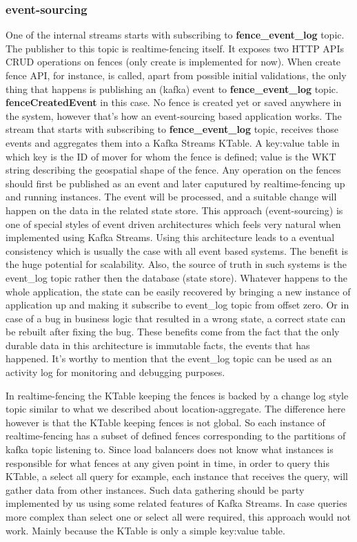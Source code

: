 \documentclass[a4]{report}
\begin{document}
    \subsubsection{event-sourcing}
    One of the internal streams starts with subscribing to \textbf{fence\_event\_log} topic.
    The publisher to this topic is realtime-fencing itself.
    It exposes two HTTP APIs CRUD operations on fences (only create is implemented for now).
    When create fence API, for instance, is called, apart from possible initial validations, the
    only thing that happens is publishing an (kafka) event to \textbf{fence\_event\_log} topic.
    \textbf{fenceCreatedEvent} in this case.
    No fence is created yet or saved anywhere in the system, however that's how an event-sourcing based application
    works.
    The stream that starts with subscribing to \textbf{fence\_event\_log} topic, receives those events and aggregates
    them into a Kafka Streams KTable.
    A key:value table in which key is the ID of mover for whom the fence is defined;
    value is the WKT string describing the geospatial shape of the fence.
    Any operation on the fences should first be published as an event and later caputured by realtime-fencing up and
    running instances.
    The event will be processed, and a suitable change will happen on the data in the related state store.
    This approach (event-sourcing) is one of special styles of event driven architectures which feels very natural
    when implemented using Kafka Streams.
    Using this architecture leads to a eventual consistency which is usually the case with all event based systems.
    The benefit is the huge potential for scalability.
    Also, the source of truth in such systems is the event\_log topic rather then the database (state store).
    Whatever happens to the whole application, the state can be easily recovered by bringing a new instance of
    application up and making it subscribe to event\_log topic from offset zero.
    Or in case of a bug in business logic that resulted in a wrong state, a correct state can be rebuilt after fixing
    the bug.
    These benefits come from the fact that the only durable data in this architecture is immutable facts, the
    events that has happened.
    It's worthy to mention that the event\_log topic can be used as an activity log for monitoring and debugging purposes.

    In realtime-fencing the KTable keeping the fences is backed by a change log style topic similar to what we
    described about location-aggregate.
    The difference here however is that the KTable keeping fences is not global.
    So each instance of realtime-fencing has a subset of defined fences corresponding to the partitions of
    kafka topic listening to.
    Since load balancers does not know what instances is responsible for what fences at any given point in time, in
    order to query this KTable, a select all query for example, each instance that receives the query, will gather
    data from other instances.
    Such data gathering should be party implemented by us using some related features of Kafka Streams.
    In case queries more complex than select one or select all were required, this approach would not work.
    Mainly because the KTable is only a simple key:value table.
\end{document}

